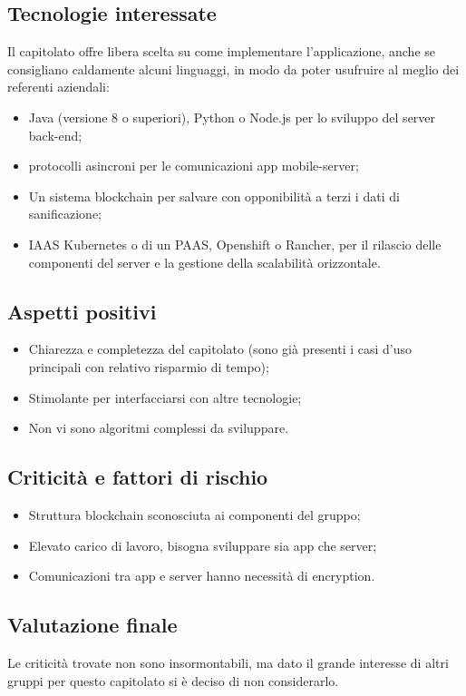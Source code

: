 \subsection{Tecnologie interessate}
Il capitolato offre libera scelta su come implementare l'applicazione, anche se consigliano caldamente alcuni linguaggi, in modo da poter usufruire al meglio dei referenti aziendali:
\begin{itemize}
\item Java (versione 8 o superiori), Python o Node.js per lo sviluppo del server back-end;
\item protocolli asincroni per le comunicazioni app mobile-server;
\item Un sistema blockchain per salvare con opponibilità a terzi i dati di sanificazione;
\item IAAS Kubernetes o di un PAAS, Openshift o Rancher, per il rilascio delle componenti del server e la
gestione della scalabilità orizzontale.
\end{itemize}

\subsection{Aspetti positivi}
\begin{itemize}
\item Chiarezza e completezza del capitolato (sono già presenti i casi d'uso principali con relativo risparmio di tempo);
\item Stimolante per interfacciarsi con altre tecnologie; 
\item Non vi sono algoritmi complessi da sviluppare.
\end{itemize}

\subsection{Criticità e fattori di rischio}
\begin{itemize}
\item Struttura blockchain sconosciuta ai componenti del gruppo;
\item Elevato carico di lavoro, bisogna sviluppare sia app che server;
\item Comunicazioni tra app e server hanno necessità di encryption.
\end{itemize}

\subsection{Valutazione finale}
Le criticità trovate non sono insormontabili, ma dato il grande interesse di altri gruppi per questo capitolato si è deciso di non considerarlo.
